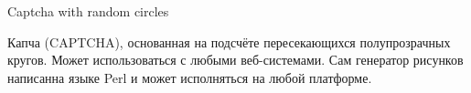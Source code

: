Captcha with random circles

Капча (C\+A\+P\+T\+C\+HA), основанная на подсчёте пересекающихся полупрозрачных кругов. Может использоваться с любыми веб-\/системами. Сам генератор рисунков написанна языке Perl и может исполняться на любой платформе. 